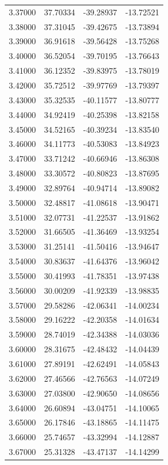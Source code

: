 \begin{table}
\begin{tabular}{llll}
3.37000 & 37.70334 & -39.28937 & -13.72521 \\
3.38000 & 37.31045 & -39.42675 & -13.73894 \\
3.39000 & 36.91618 & -39.56428 & -13.75268 \\
3.40000 & 36.52054 & -39.70195 & -13.76643 \\
3.41000 & 36.12352 & -39.83975 & -13.78019 \\
3.42000 & 35.72512 & -39.97769 & -13.79397 \\
3.43000 & 35.32535 & -40.11577 & -13.80777 \\
3.44000 & 34.92419 & -40.25398 & -13.82158 \\
3.45000 & 34.52165 & -40.39234 & -13.83540 \\
3.46000 & 34.11773 & -40.53083 & -13.84923 \\
3.47000 & 33.71242 & -40.66946 & -13.86308 \\
3.48000 & 33.30572 & -40.80823 & -13.87695 \\
3.49000 & 32.89764 & -40.94714 & -13.89082 \\
3.50000 & 32.48817 & -41.08618 & -13.90471 \\
3.51000 & 32.07731 & -41.22537 & -13.91862 \\
3.52000 & 31.66505 & -41.36469 & -13.93254 \\
3.53000 & 31.25141 & -41.50416 & -13.94647 \\
3.54000 & 30.83637 & -41.64376 & -13.96042 \\
3.55000 & 30.41993 & -41.78351 & -13.97438 \\
3.56000 & 30.00209 & -41.92339 & -13.98835 \\
3.57000 & 29.58286 & -42.06341 & -14.00234 \\
3.58000 & 29.16222 & -42.20358 & -14.01634 \\
3.59000 & 28.74019 & -42.34388 & -14.03036 \\
3.60000 & 28.31675 & -42.48432 & -14.04439 \\
3.61000 & 27.89191 & -42.62491 & -14.05843 \\
3.62000 & 27.46566 & -42.76563 & -14.07249 \\
3.63000 & 27.03800 & -42.90650 & -14.08656 \\
3.64000 & 26.60894 & -43.04751 & -14.10065 \\
3.65000 & 26.17846 & -43.18865 & -14.11475 \\
3.66000 & 25.74657 & -43.32994 & -14.12887 \\
3.67000 & 25.31328 & -43.47137 & -14.14299 \\

\end{tabular}
\end{table}
